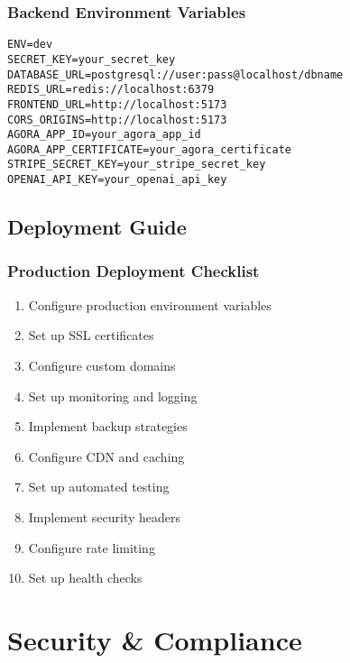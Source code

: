 \documentclass[11pt,a4paper]{article}
\begin{document}
\subsubsection{Backend Environment Variables}
\begin{lstlisting}[caption=Backend .env File]
ENV=dev
SECRET_KEY=your_secret_key
DATABASE_URL=postgresql://user:pass@localhost/dbname
REDIS_URL=redis://localhost:6379
FRONTEND_URL=http://localhost:5173
CORS_ORIGINS=http://localhost:5173
AGORA_APP_ID=your_agora_app_id
AGORA_APP_CERTIFICATE=your_agora_certificate
STRIPE_SECRET_KEY=your_stripe_secret_key
OPENAI_API_KEY=your_openai_api_key
\end{lstlisting}

\subsection{Deployment Guide}

\subsubsection{Production Deployment Checklist}
\begin{enumerate}
    \item Configure production environment variables
    \item Set up SSL certificates
    \item Configure custom domains
    \item Set up monitoring and logging
    \item Implement backup strategies
    \item Configure CDN and caching
    \item Set up automated testing
    \item Implement security headers
    \item Configure rate limiting
    \item Set up health checks
\end{enumerate}

\section{Security \& Compliance}
\end{document}
